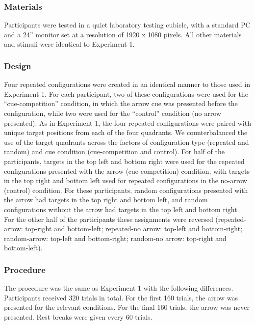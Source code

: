 \documentclass[
  man,floatsintext]{apa7}
\begin{document}
\hypertarget{materials-1}{%
\subsubsection{Materials}\label{materials-1}}

Participants were tested in a quiet laboratory testing cubicle, with a standard PC and a 24'' monitor set at a resolution of 1920 x 1080 pixels. All other materials and stimuli were identical to Experiment 1.

\hypertarget{design-1}{%
\subsubsection{Design}\label{design-1}}

Four repeated configurations were created in an identical manner to those used in Experiment 1. For each participant, two of these configurations were used for the ``cue-competition'' condition, in which the arrow cue was presented before the configuration, while two were used for the ``control'' condition (no arrow presented). As in Experiment 1, the four repeated configurations were paired with unique target positions from each of the four quadrants. We counterbalanced the use of the target quadrants across the factors of configuration type (repeated and random) and cue condition (cue-competition and control). For half of the participants, targets in the top left and bottom right were used for the repeated configurations presented with the arrow (cue-competition) condition, with targets in the top right and bottom left used for repeated configurations in the no-arrow (control) condition. For these participants, random configurations presented with the arrow had targets in the top right and bottom left, and random configurations without the arrow had targets in the top left and bottom right. For the other half of the participants these assignments were reversed (repeated-arrow: top-right and bottom-left; repeated-no arrow: top-left and bottom-right; random-arrow: top-left and bottom-right; random-no arrow: top-right and bottom-left).

\hypertarget{procedure-1}{%
\subsubsection{Procedure}\label{procedure-1}}

The procedure was the same as Experiment 1 with the following differences. Participants received 320 trials in total. For the first 160 trials, the arrow was presented for the relevant conditions. For the final 160 trials, the arrow was never presented. Rest breaks were given every 60 trials.
\end{document}
